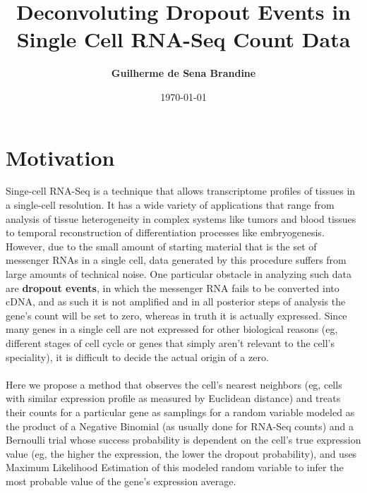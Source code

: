 \documentclass[11pt]{article}
\title{\bf Deconvoluting Dropout Events in Single Cell RNA-Seq Count Data}
\author{\bf Guilherme de Sena Brandine}
\date{\today}
\begin{document}
\maketitle

\section{Motivation}
Singe-cell RNA-Seq is a technique that allows transcriptome profiles of tissues in a single-cell resolution. It has a wide variety of applications that range from analysis of tissue heterogeneity in complex systems like tumors and blood tissues to temporal reconstruction of differentiation processes like embryogenesis. However, due to the small amount of starting material that is the set of messenger RNAs in a single cell, data generated by this procedure suffers from large amounts of technical noise. One particular obstacle in analyzing such data are \textbf{dropout events}, in which the messenger RNA fails to be converted into cDNA, and as such it is not amplified and in all posterior steps of analysis the gene's count will be set to zero, whereas in truth it is actually expressed. Since many genes in a single cell are not expressed for other biological reasons (eg, different stages of cell cycle or genes that simply aren't relevant to the cell's speciality), it is difficult to decide the actual origin of a zero. \\
\\
Here we propose a method that observes the cell's nearest neighbors (eg, cells with similar expression profile as measured by Euclidean distance) and treats their counts for a particular gene as samplings for a random variable modeled as the product of a Negative Binomial (as usually done for RNA-Seq counts) and a Bernoulli trial whose success probability is dependent on the cell's true expression value (eg, the higher the expression, the lower the dropout probability), and uses Maximum Likelihood Estimation of this modeled random variable to infer the most probable value of the gene's expression average. 
\end{document}
